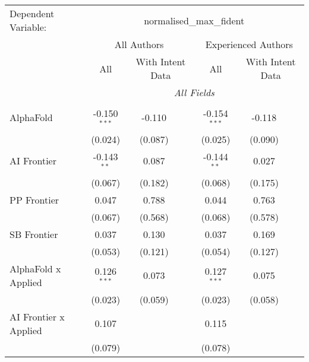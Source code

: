 \begingroup
\centering
\begin{tabular}{lcccccc}
   \tabularnewline \midrule \midrule
   Dependent Variable: & \multicolumn{6}{c}{normalised\_max\_fident}\\
 & \multicolumn{3}{c}{All Authors} & \multicolumn{3}{c}{Experienced Authors} \\
\cmidrule(lr){2-4} \cmidrule(lr){5-7}
 & \multicolumn{1}{c}{All} & \multicolumn{2}{c}{With Intent Data} & \multicolumn{1}{c}{All} & \multicolumn{2}{c}{With Intent Data} \\
\cmidrule(lr){2-2} \cmidrule(lr){3-4} \cmidrule(lr){5-5} \cmidrule(lr){6-7}
 & \multicolumn{6}{c}{\textit{All Fields}} \\ \\
   AlphaFold                      & -0.150$^{***}$ & -0.110  &               & -0.154$^{***}$ & -0.118  &   \\   
                                  & (0.024)        & (0.087) &               & (0.025)        & (0.090) &   \\   
   AI Frontier                    & -0.143$^{**}$  & 0.087   &               & -0.144$^{**}$  & 0.027   &   \\   
                                  & (0.067)        & (0.182) &               & (0.068)        & (0.175) &   \\   
   PP Frontier                    & 0.047          & 0.788   &               & 0.044          & 0.763   &   \\   
                                  & (0.067)        & (0.568) &               & (0.068)        & (0.578) &   \\   
   SB Frontier                    & 0.037          & 0.130   &               & 0.037          & 0.169   &   \\   
                                  & (0.053)        & (0.121) &               & (0.054)        & (0.127) &   \\   
   AlphaFold x Applied            & 0.126$^{***}$  & 0.073   &               & 0.127$^{***}$  & 0.075   &   \\   
                                  & (0.023)        & (0.059) &               & (0.023)        & (0.058) &   \\   
   AI Frontier x Applied          & 0.107          &         &               & 0.115          &         &   \\   
                                  & (0.079)        &         &               & (0.078)        &         &   \\   

\end{tabular}

